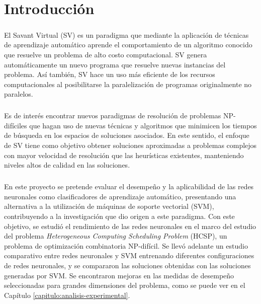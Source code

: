 \chapter{Introducción} \label{section-introduccion}

\paragraph{} El Savant Virtual (SV) es un paradigma que mediante la aplicación de técnicas de aprendizaje automático aprende el comportamiento de un algoritmo conocido que resuelve un problema de alto costo computacional. SV genera automáticamente un nuevo programa que resuelve nuevas instancias del problema.\cite{savant-original}
Así también, SV hace un uso más eficiente de los recursos computacionales al posibilitarse la paralelización de programas originalmente no paralelos.

\paragraph{} Es de interés encontrar nuevos paradigmas de resolución de problemas NP-difíciles que hagan uso de nuevas técnicas y algoritmos que minimicen los tiempos de búsqueda en los espacios de soluciones asociados.
En este sentido, el enfoque de SV tiene como objetivo obtener soluciones aproximadas a problemas complejos con mayor velocidad de resolución que las heurísticas existentes, manteniendo niveles altos de calidad en las soluciones. 

\paragraph{} En este proyecto se pretende evaluar el desempeño y la aplicabilidad de las redes neuronales como clasificadores de aprendizaje automático, presentando una alternativa a la utilización de máquinas de soporte vectorial (SVM), contribuyendo a la investigación que dio origen a este paradigma.
Con este objetivo, se estudió el rendimiento de las redes neuronales en el marco del estudio del problema \textit{Heterogeneous Computing Scheduling Problem} (HCSP), un problema de optimización combinatoria NP-difícil.
Se llevó adelante un estudio comparativo entre redes neuronales y SVM entrenando diferentes configuraciones de redes neuronales, y se compararon las soluciones obtenidas con las soluciones generadas por SVM. Se encontraron mejoras en las medidas de desempeño seleccionadas para grandes dimensiones del problema, como se puede ver en el Capítulo \ref{capitulo:analisis-experimental}.


